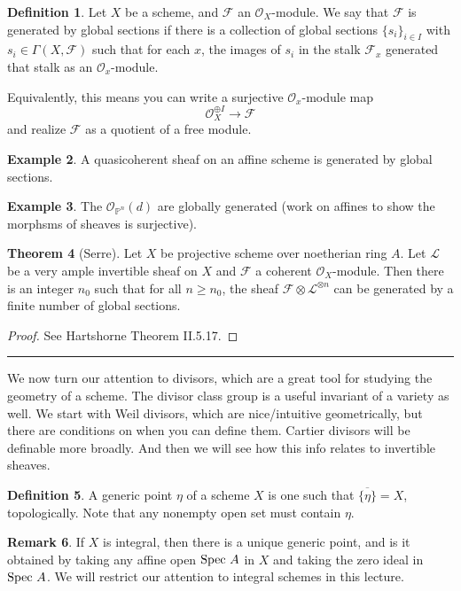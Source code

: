 \documentclass[10pt,reqno]{amsart}
\theoremstyle{definition}
\newtheorem{theorem}{Theorem}
\newtheorem{example}[theorem]{Example}
\newtheorem{definition}[theorem]{Definition}
\newtheorem{remark}[theorem]{Remark}
\theoremstyle{remark}
\numberwithin{equation}{section}
\numberwithin{theorem}{section}
\newcommand{\OO}{{\mathcal O}}
\newcommand{\spec}{\textup{Spec }}
\newcommand{\FF}{{\mathscr F}}
\newcommand{\LL}{{\mathscr L}}
\newcommand{\PP}{{\mathbb P}}
\begin{document}
\begin{definition} Let $X$ be a scheme, and $\FF$ an $\OO_X$-module. We say that $\FF$ is generated by global sections if there is a collection of global sections $\{s_i\}_{i \in I}$ with $s_i \in \Gamma(X,\FF)$ such that for each $x$, the images of $s_i$ in the stalk $\FF_x$ generated that stalk as an $\OO_x$-module.

Equivalently, this means you can write a surjective $\OO_x$-module map
\[\OO_X^{\oplus I}  \to \FF\]
and realize $\FF$ as a quotient of a free module.
\end{definition}

\begin{example} A quasicoherent sheaf on an affine scheme is generated by global sections.
\end{example}

\begin{example}
The $\OO_{\PP^n}(d)$ are globally generated (work on affines to show the morphsms of sheaves is surjective).
\end{example}

\begin{theorem}[Serre] Let $X$ be projective scheme over noetherian ring $A$. Let $\LL$ be a very ample invertible sheaf on $X$ and $\FF$ a coherent $\OO_X$-module. Then there is an integer $n_0$ such that for all $n \ge n_0$, the sheaf $\FF \otimes \LL^{\otimes n}$ can be generated by a finite number of global sections.
\end{theorem}
\begin{proof} See Hartshorne Theorem II.5.17.
\end{proof}
\hrule
\vspace{1em}

We now turn our attention to divisors, which are a great tool for studying the geometry of a scheme. The divisor class group is a useful invariant of a variety as well. We start with Weil divisors, which are nice/intuitive geometrically, but there are conditions on when you can define them. Cartier divisors will be definable more broadly. And then we will see how this info relates to invertible sheaves.


\begin{definition} A generic point $\eta$ of a scheme $X$ is one such that $\overline{\{\eta\}} = X$, topologically. Note that any nonempty open set must contain $\eta$.
\end{definition}

\begin{remark} If $X$ is integral, then there is a unique generic point, and is it obtained by taking any affine open $\spec A$ in $X$ and taking the zero ideal in $\spec A$. We will restrict our attention to integral schemes in this lecture.
\end{remark}
\end{document}
